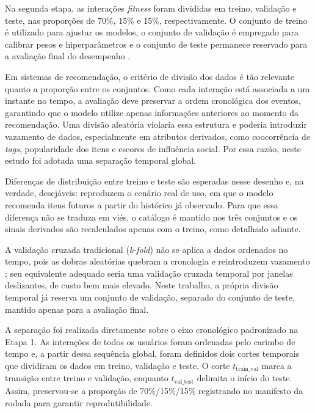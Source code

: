 \documentclass[a4paper,12pt]{article}
\begin{document}
{Na segunda etapa, as interações \textit{fitness} foram divididas em treino, validação e teste, nas proporções de 70\%, 15\% e 15\%, respectivamente. O conjunto de treino é utilizado para ajustar os modelos, o conjunto de validação é empregado para calibrar pesos e hiperparâmetros e o conjunto de teste permanece reservado para a avaliação final do desempenho \cite{Goodfellow2016DeepLearning,Hastie2001Elements}.

Em sistemas de recomendação, o critério de divisão dos dados é tão relevante quanto a proporção entre os conjuntos. Como cada interação está associada a um instante no tempo, a avaliação deve preservar a ordem cronológica dos eventos, garantindo que o modelo utilize apenas informações anteriores ao momento da recomendação. Uma divisão aleatória violaria essa estrutura e poderia introduzir vazamento de dados, especialmente em atributos derivados, como coocorrência de \textit{tags}, popularidade dos itens e escores de influência social. Por essa razão, neste estudo foi adotada uma separação temporal global.

Diferenças de distribuição entre treino e teste são esperadas nesse desenho e, na verdade, desejáveis: reproduzem o cenário real de uso, em que o modelo recomenda itens futuros a partir do histórico já observado. Para que essa diferença não se traduza em viés, o catálogo é mantido nos três conjuntos e os sinais derivados são recalculados apenas com o treino, como detalhado adiante.

A validação cruzada tradicional (\textit{k-fold}) não se aplica a dados ordenados no tempo, pois as dobras aleatórias quebram a cronologia e reintroduzem vazamento \cite{BERGMEIR2012192}; seu equivalente adequado seria uma validação cruzada temporal por janelas deslizantes, de custo bem mais elevado. Neste trabalho, a própria divisão temporal já reserva um conjunto de validação, separado do conjunto de teste, mantido apenas para a avaliação final.

A separação foi realizada diretamente sobre o eixo cronológico padronizado na Etapa 1. As interações de todos os usuários foram ordenadas pelo carimbo de tempo e, a partir dessa sequência global, foram definidos dois cortes temporais que dividiram os dados em treino, validação e teste. O corte $t_{\text{train\_val}}$ marca a transição entre treino e validação, enquanto
$t_{\text{val\_test}}$ delimita o início do teste. Assim, preservou-se a proporção de 70\%/15\%/15\% registrando no manifesto da rodada para garantir reprodutibilidade.

}
\end{document}
